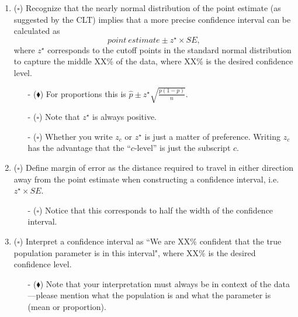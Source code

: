 \documentclass[11pt]{article}
\newcommand{\bs}{$\square$}
\newcommand{\bd}{$\blacklozenge$}
\begin{document}
\begin{enumerate}[resume]
\item (\bs) Recognize that the nearly normal distribution of the point estimate (as suggested by the CLT) implies that a more precise confidence interval can be calculated as
\[ point~estimate \pm z^{\star} \times SE, \] 
where $z^{\star}$ corresponds to the cutoff points in the standard normal distribution to capture the middle XX\% of the data, where XX\% is the desired confidence level.
\begin{itemize}
\item[-] (\bd) For proportions this is $\hat{p} \pm z^\star \sqrt{\frac{p(1-p)}{n}}$.
\item[-] (\bs) Note that $z^{\star}$ is always positive. 
\item[-] (\bs) Whether you write $z_c$ or $z^\star$ is just a matter of preference. Writing $z_c$ has the advantage that the ``$c$-level'' is just the subscript $c$.
\end{itemize}

\item (\bs) Define margin of error as the distance required to travel in either direction away from the point estimate when constructing a confidence interval, i.e. $z^{\star} \times SE$.
\begin{itemize}
\item[-] (\bs) Notice that this corresponds to half the width of the confidence interval.
\end{itemize}

\item (\bs) Interpret a confidence interval as ``We are XX\% confident that the true population parameter is in this interval", where XX\% is the desired confidence level.
\begin{itemize}
\item[-] (\bd) Note that your interpretation must always be in context of the data---please mention what the population is and what the parameter is (mean or proportion).
\end{itemize}


\end{enumerate}
\end{document}
